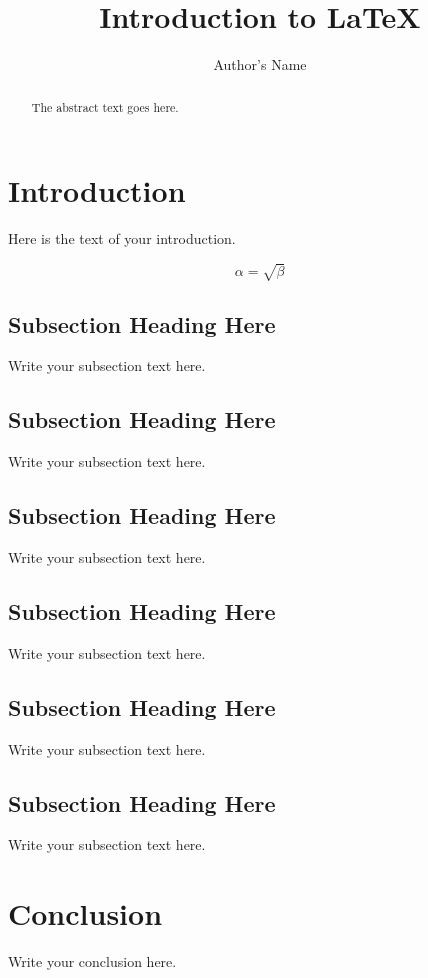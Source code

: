 \documentclass[11pt,twoside,openright,a4paper,pagesize]{article}
\begin{document}
\title{Introduction to \LaTeX{}}
\author{Author's Name}

\maketitle
\thispagestyle{firststyle}
\begin{abstract}
The abstract text goes here.
\end{abstract}

\section{Introduction}
Here is the text of your introduction.

\begin{equation}
    \label{simple_equation}
    \alpha = \sqrt{ \beta }
\end{equation}

\subsection{Subsection Heading Here}
Write your subsection text here.

\subsection{Subsection Heading Here}
Write your subsection text here.

\subsection{Subsection Heading Here}
Write your subsection text here.

\subsection{Subsection Heading Here}
Write your subsection text here.

\subsection{Subsection Heading Here}
Write your subsection text here.

\subsection{Subsection Heading Here}
Write your subsection text here.


\section{Conclusion}
Write your conclusion here.
\label{LastPage}
\end{document}
